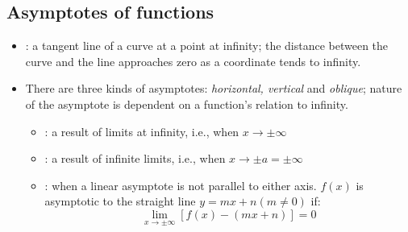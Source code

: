 \begin{itemize}
  \subsection{Asymptotes of functions}
  \begin{itemize}
    \item  {}: a tangent line of a curve at a point at infinity; the distance between the curve and the line approaches zero as a coordinate tends to infinity.
    \item There are three kinds of asymptotes: \textit{horizontal, vertical} and \textit{oblique}; nature of the asymptote is dependent on a function's relation to infinity.
      \begin{itemize}
        \item {}: a result of limits at infinity, i.e., when \(x\to \pm \infty\)
        \item {}: a result of infinite limits, i.e., when \(x\to \pm a = \pm \infty\)
        \item {}: when a linear asymptote is not parallel to either axis. \(f(x)\) is asymptotic to the straight line \(y=mx+n (m\neq 0)\) if:
        \[%
        \lim_{x \to \pm\infty} \left[
          f(x) - \left(
            mx + n
          \right) 
        \right] = 0
        \]%
      \end{itemize}
  \end{itemize}
\end{itemize}
